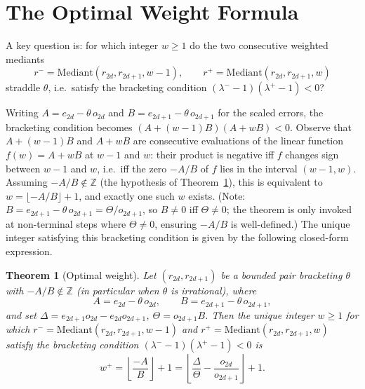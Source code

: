 \documentclass[12pt]{article}
\newtheorem{theorem}{Theorem}[section]
\theoremstyle{definition}
\theoremstyle{remark}
\theoremstyle{plain}
\newcommand{\lam}{\lambda}
\newcommand{\Kval}{\Theta}
\newcommand{\Dval}{\Delta}
\newcommand{\wplus}{w^{+}}
\newcommand{\rplus}{r^{+}}
\newcommand{\rminus}{r^{-}}
\newcommand{\lamplus}{\lam^{+}}
\newcommand{\lamminus}{\lam^{-}}
\begin{document}
\section{The Optimal Weight Formula}
\label{sec:optimal-w}

A key question is: for which integer $w \geq 1$ do the two consecutive weighted mediants
\[
  \rminus = \mathrm{Mediant}(r_{2d}, r_{2d+1}, w-1), \qquad \rplus = \mathrm{Mediant}(r_{2d}, r_{2d+1}, w)
\]
straddle $\theta$, i.e.\ satisfy the bracketing condition $(\lamminus - 1)(\lamplus - 1) < 0$?

Writing $A = e_{2d} - \theta\,o_{2d}$ and $B = e_{2d+1} - \theta\,o_{2d+1}$ for the scaled
errors, the bracketing condition becomes $(A + (w-1)B)(A + wB) < 0$.
Observe that $A + (w-1)B$ and $A + wB$ are consecutive evaluations of the linear
function $f(w) = A + wB$ at $w-1$ and $w$: their product is negative iff $f$ changes
sign between $w-1$ and $w$, i.e.\ iff the zero $-A/B$ of $f$ lies in the interval
$(w-1, w)$.
Assuming $-A/B \notin \mathbb{Z}$ (the hypothesis of Theorem~\ref{thm:optimal-w}),
this is equivalent to $w = \lfloor -A/B \rfloor + 1$, and exactly one such $w$ exists.
(Note: $B = e_{2d+1} - \theta\,o_{2d+1} = \Theta/o_{2d+1}$, so $B \neq 0$ iff
$\Theta \neq 0$; the theorem is only invoked at non-terminal steps where $\Theta \neq 0$,
ensuring $-A/B$ is well-defined.)
The unique integer satisfying this bracketing condition is given by the following
closed-form expression.

\begin{theorem}[Optimal weight]
\label{thm:optimal-w}
Let $(r_{2d}, r_{2d+1})$ be a bounded pair bracketing $\theta$ with $-A/B \notin \mathbb{Z}$
(in particular when $\theta$ is irrational), where
\[
  A = e_{2d} - \theta\,o_{2d}, \qquad B = e_{2d+1} - \theta\,o_{2d+1},
\]
and set $\Dval = e_{2d+1}o_{2d} - e_{2d} o_{2d+1}$, $\Kval = o_{2d+1} B$.
Then the unique integer $w \geq 1$ for which $\rminus = \mathrm{Mediant}(r_{2d}, r_{2d+1}, w-1)$
and $\rplus = \mathrm{Mediant}(r_{2d}, r_{2d+1}, w)$ satisfy the bracketing condition
$(\lamminus - 1)(\lamplus - 1) < 0$ is
\[
  \wplus = \left\lfloor \frac{-A}{B} \right\rfloor + 1
      = \left\lfloor \frac{\Dval}{\Kval} - \frac{o_{2d}}{o_{2d+1}} \right\rfloor + 1.
\]
\end{theorem}
\end{document}
